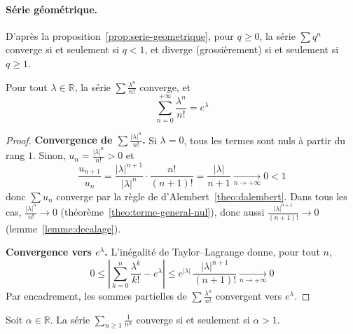 \paragraph{Série géométrique.} D'après la proposition~\ref{prop:serie-geometrique}, pour $q\geq 0$, la série $\sum q^n$ converge si et seulement si $q<1$, et diverge (grossièrement) si et seulement si $q\geq 1$.

\begin{prop}
\label{prop:serie-exponentielle}
Pour tout $\lambda\in\mathbb{R}$, la série $\sum\frac{\lambda^n}{n!}$ converge, et
\[\sum_{n=0}^{+\infty}\frac{\lambda^n}{n!}=e^{\lambda}\]
\end{prop}

\begin{proof}
\textbf{Convergence de $\sum\frac{|\lambda|^n}{n!}$.} Si $\lambda=0$, tous les termes sont nuls à partir du rang $1$. Sinon, $u_n=\frac{|\lambda|^n}{n!}>0$ et
\[\frac{u_{n+1}}{u_n}=\frac{|\lambda|^{n+1}}{|\lambda|^n}\cdot\frac{n!}{(n+1)!}=\frac{|\lambda|}{n+1}\xrightarrow[n\to+\infty]{}0<1\]
donc $\sum u_n$ converge par la règle de d'Alembert~\ref{theo:dalembert}. Dans tous les cas, $\frac{|\lambda|^{n}}{n!}\to 0$ (théorème~\ref{theo:terme-general-nul}), donc aussi $\frac{|\lambda|^{n+1}}{(n+1)!}\to 0$ (lemme~\ref{lemme:decalage}).

\textbf{Convergence vers $e^\lambda$.} L'inégalité de Taylor--Lagrange donne, pour tout $n$,
\[0\leq\left|\sum_{k=0}^{n}\frac{\lambda^k}{k!}-e^\lambda\right|\leq e^{|\lambda|}\,\frac{|\lambda|^{n+1}}{(n+1)!}\xrightarrow[n\to+\infty]{}0\]
Par encadrement, les sommes partielles de $\sum\frac{\lambda^n}{n!}$ convergent vers $e^\lambda$.
\end{proof}

\begin{theo}
\label{theo:riemann}
Soit $\alpha\in\mathbb{R}$. La série $\displaystyle\sum_{n\geq1}\frac{1}{n^\alpha}$ converge si et seulement si $\alpha>1$.
\end{theo}

